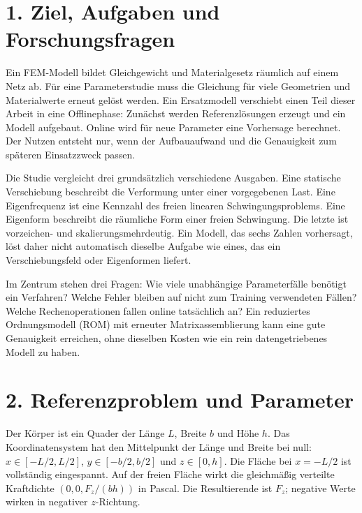 \documentclass[11pt,a4paper]{article}
\begin{document}
\section{1. Ziel, Aufgaben und Forschungsfragen}
Ein FEM-Modell bildet Gleichgewicht und Materialgesetz räumlich auf einem Netz ab. Für eine Parameterstudie muss die Gleichung für viele Geometrien und Materialwerte erneut gelöst werden. Ein Ersatzmodell verschiebt einen Teil dieser Arbeit in eine Offlinephase: Zunächst werden Referenzlösungen erzeugt und ein Modell aufgebaut. Online wird für neue Parameter eine Vorhersage berechnet. Der Nutzen entsteht nur, wenn der Aufbauaufwand und die Genauigkeit zum späteren Einsatzzweck passen.

Die Studie vergleicht drei grundsätzlich verschiedene Ausgaben. Eine statische Verschiebung beschreibt die Verformung unter einer vorgegebenen Last. Eine Eigenfrequenz ist eine Kennzahl des freien linearen Schwingungsproblems. Eine Eigenform beschreibt die räumliche Form einer freien Schwingung. Die letzte ist vorzeichen- und skalierungsmehrdeutig. Ein Modell, das sechs Zahlen vorhersagt, löst daher nicht automatisch dieselbe Aufgabe wie eines, das ein Verschiebungsfeld oder Eigenformen liefert.

Im Zentrum stehen drei Fragen: Wie viele unabhängige Parameterfälle benötigt ein Verfahren? Welche Fehler bleiben auf nicht zum Training verwendeten Fällen? Welche Rechenoperationen fallen online tatsächlich an? Ein reduziertes Ordnungsmodell (ROM) mit erneuter Matrixassemblierung kann eine gute Genauigkeit erreichen, ohne dieselben Kosten wie ein rein datengetriebenes Modell zu haben.

\section{2. Referenzproblem und Parameter}
Der Körper ist ein Quader der Länge $L$, Breite $b$ und Höhe $h$. Das Koordinatensystem hat den Mittelpunkt der Länge und Breite bei null: $x\in[-L/2,L/2]$, $y\in[-b/2,b/2]$ und $z\in[0,h]$. Die Fläche bei $x=-L/2$ ist vollständig eingespannt. Auf der freien Fläche wirkt die gleichmäßig verteilte Kraftdichte $(0,0,F_z/(bh))$ in Pascal. Die Resultierende ist $F_z$; negative Werte wirken in negativer $z$-Richtung.
\end{document}
